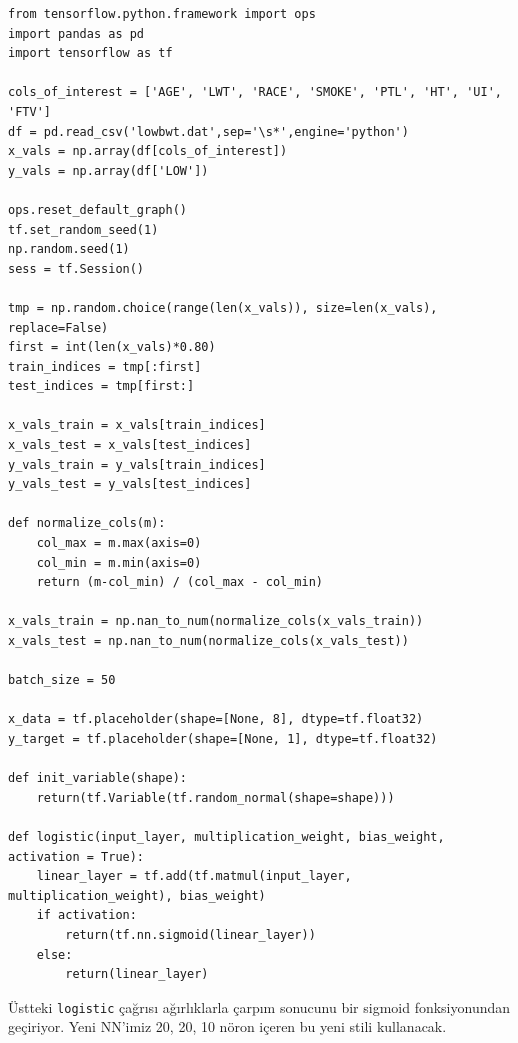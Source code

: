 \documentclass[12pt,fleqn]{article}\usepackage{../../common}
\begin{document}
\begin{verbatim}
from tensorflow.python.framework import ops
import pandas as pd
import tensorflow as tf

cols_of_interest = ['AGE', 'LWT', 'RACE', 'SMOKE', 'PTL', 'HT', 'UI', 'FTV']
df = pd.read_csv('lowbwt.dat',sep='\s*',engine='python')
x_vals = np.array(df[cols_of_interest])
y_vals = np.array(df['LOW'])

ops.reset_default_graph()
tf.set_random_seed(1)
np.random.seed(1)
sess = tf.Session()

tmp = np.random.choice(range(len(x_vals)), size=len(x_vals), replace=False)
first = int(len(x_vals)*0.80)
train_indices = tmp[:first]
test_indices = tmp[first:]

x_vals_train = x_vals[train_indices]
x_vals_test = x_vals[test_indices]
y_vals_train = y_vals[train_indices]
y_vals_test = y_vals[test_indices]

def normalize_cols(m):
    col_max = m.max(axis=0)
    col_min = m.min(axis=0)
    return (m-col_min) / (col_max - col_min)
    
x_vals_train = np.nan_to_num(normalize_cols(x_vals_train))
x_vals_test = np.nan_to_num(normalize_cols(x_vals_test))

batch_size = 50

x_data = tf.placeholder(shape=[None, 8], dtype=tf.float32)
y_target = tf.placeholder(shape=[None, 1], dtype=tf.float32)

def init_variable(shape):
    return(tf.Variable(tf.random_normal(shape=shape)))

def logistic(input_layer, multiplication_weight, bias_weight, activation = True):
    linear_layer = tf.add(tf.matmul(input_layer, multiplication_weight), bias_weight)
    if activation:
        return(tf.nn.sigmoid(linear_layer))
    else:
        return(linear_layer)
\end{verbatim}

Üstteki \verb!logistic! çağrısı ağırlıklarla çarpım sonucunu bir sigmoid
fonksiyonundan geçiriyor. Yeni NN'imiz 20, 20, 10 nöron içeren bu yeni
stili kullanacak.
\end{document}
